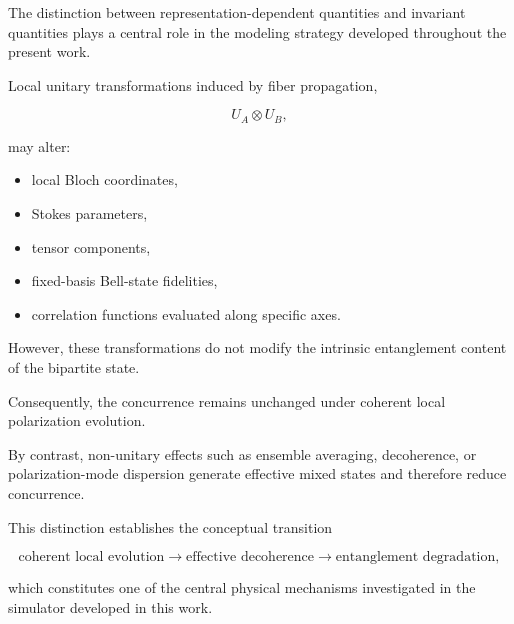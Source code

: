 The distinction between representation-dependent quantities and invariant quantities plays a central role in the modeling strategy developed throughout the present work.

\medskip

Local unitary transformations induced by fiber propagation,

\[
U_A \otimes U_B,
\]

may alter:

\begin{itemize}

\item local Bloch coordinates,

\item Stokes parameters,

\item tensor components,

\item fixed-basis Bell-state fidelities,

\item correlation functions evaluated along specific axes.

\end{itemize}

However, these transformations do not modify the intrinsic entanglement content of the bipartite state.

Consequently, the concurrence remains unchanged under coherent local polarization evolution.

\medskip

By contrast, non-unitary effects such as ensemble averaging, decoherence, or polarization-mode dispersion generate effective mixed states and therefore reduce concurrence.

This distinction establishes the conceptual transition

\[
\text{coherent local evolution}
\rightarrow
\text{effective decoherence}
\rightarrow
\text{entanglement degradation},
\]

which constitutes one of the central physical mechanisms investigated in the simulator developed in this work.

